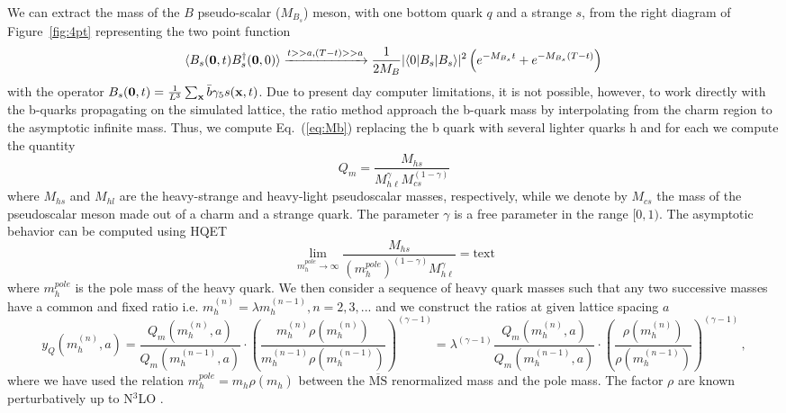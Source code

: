 We can extract the mass of the $B$ pseudo-scalar ($M_{B_s}$) meson, with one bottom quark $q$
and a strange $s$,
from the right diagram of Figure~\ref{fig:4pt} representing the two point function
\begin{equation}
  \langle B_s(\bm{0},t) B_s^\dagger({\bf 0},0)\rangle\xrightarrow{t>>a, (T-t)>>a}
  \frac{1}{2M_B}|\langle 0 | B_s | B_s\rangle|^2\left(e^{-M_{B_s} t}+e^{-M_{B_s}(T-t)}\right)
  \, \label{eq:Mb}
\end{equation}
with the operator $B_s({\bf 0},t)=\frac{1}{L^3}\sum_{\bf x}\bar b\gamma_5 s({\bf x},t)$.
Due to present day computer limitations, it is not possible, however, to work directly
with the b-quarks propagating on the simulated lattice, the ratio method approach the
b-quark mass by interpolating from the charm region to the asymptotic infinite mass.
Thus, we compute Eq.~(\ref{eq:Mb}) replacing the b quark with several lighter quarks h
and for each we compute the quantity
\begin{equation}
  Q_m = \frac{M_{hs}}{M_{h\ell}^\gamma M_{cs}^{(1-\gamma)}}
\end{equation}
where $M_{hs}$ and $M_{hl}$ are the heavy-strange and heavy-light
pseudoscalar masses, respectively, while we denote by $M_{cs}$
the mass of the pseudoscalar meson made out of a charm
and a strange quark. The parameter $\gamma$ is a free parameter in the range  $[0, 1)$.
The asymptotic behavior can be computed using HQET
\begin{equation}
  \lim_{ m^{pole}_h\to \infty}
  \frac{M_{hs}}{( m^{pole}_h)^{(1-\gamma)} M_{h\ell}^\gamma}=\mbox{text}
  \label{eq:yHQFTlim}
\end{equation}
where $ m^{pole}_h$ is the pole mass of the heavy quark.
We then consider a sequence of heavy quark masses such that any two
successive masses have a common and fixed ratio i.e.
$ m_h^{(n)}=\lambda m_h^{(n-1)}, n=2,3,...$ and we construct the ratios
at given lattice spacing $a$
\begin{equation}
  y_Q( m^{(n)}_h,a)=\frac{Q_m( m_h^{(n)},a)}{Q_m( m_h^{(n-1)},a)}\cdot
  \left(\frac{ m_{h}^{(n)} \rho( m_{h}^{(n)})}{ m_{h}^{(n-1)}\rho( m_{h}^{(n-1)})}\right)^{(\gamma-1)}
  =\lambda^{(\gamma-1)}\frac{Q_m( m_h^{(n)},a)}{Q_m( m_h^{(n-1)},a)}\cdot
  \left(\frac{ \rho( m_{h}^{(n)})}{\rho( m_{h}^{(n-1)})}\right)^{(\gamma-1)}\,,
\end{equation}
where we have used the relation  $ m^{pole}_h= m_{h}^{} \rho( m_{h}^{})$
between the $\overline{\mbox{MS}}$ renormalized mass and the pole mass.
The factor $\rho$ are known perturbatively up to N$^3$LO \cite{Chetyrkin:1999pq}.

